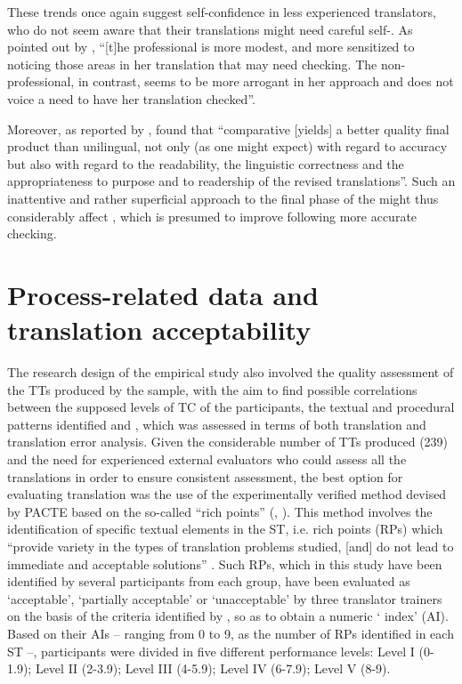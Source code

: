 \documentclass[output=paper]{LSP/langsci}
\begin{document}
These trends once again suggest self-confidence in less experienced translators, who do not seem aware that their translations might need careful self-. As pointed out by \citet[439]{TirkkonenCondit1992}, ``[t]he professional is more modest, and more sensitized to noticing those areas in her translation that may need checking. The non-professional, in contrast, seems to be more arrogant in her approach and does not voice a need to have her translation checked''.


Moreover, as reported by \citet{Mossop2007Empirical}, \citet{Brunette2005} found that ``comparative  [yields] a better quality final product than unilingual, not only (as one might expect) with regard to accuracy but also with regard to the readability, the linguistic correctness and the appropriateness to purpose and to readership of the revised translations''. Such an inattentive and rather superficial approach to the final phase of the  might thus considerably affect , which is presumed to improve following more accurate checking.


\section{Process-related data and translation acceptability}

The research design of the empirical study also involved the quality assessment of the TTs produced by the sample, with the aim to find possible correlations between the supposed levels of TC of the participants, the textual and procedural patterns identified and , which was assessed in terms of both translation  and translation error analysis. Given the considerable number of TTs produced (239) and the need for experienced external evaluators who could assess all the translations in order to ensure consistent assessment, the best option for evaluating translation  was the use of the experimentally verified \citep{Castillo2010} method devised by PACTE based on the so-called ``rich points''
(\citealt{PACTE2005Primeros}, \citealt{PACTE2009}). This method involves the identification of specific textual elements in the ST, i.e. rich points (RPs) which ``provide variety in the types of translation problems studied, [and] do not lead to immediate and acceptable solutions'' \citep[614]{PACTE2005Investigating}. Such RPs, which in this study have been identified by several participants from each group, have been evaluated as `acceptable', `partially acceptable' or `unacceptable' by three translator trainers on the basis of the criteria identified by \citet[217]{PACTE2009}, so as to obtain a numeric ` index' (AI). Based on their AIs -- ranging from 0 to 9, as the number of RPs identified in each ST --, participants were divided in five different performance levels: Level I (0-1.9); Level II (2-3.9); Level III (4-5.9); Level IV (6-7.9); Level V (8-9).
\end{document}
